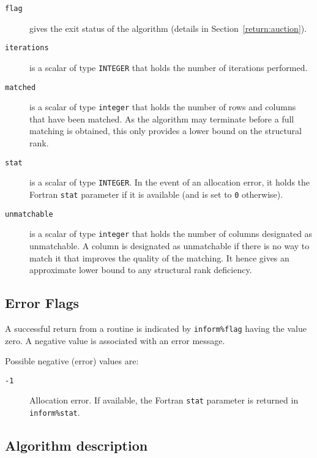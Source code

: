 \begin{description}

\item[\texttt{flag}] gives the exit status of the algorithm (details in Section~\ref{return:auction}).

\item[\texttt{iterations}] is a scalar of type \texttt{INTEGER} that holds the number of iterations performed.

\item[\texttt{matched}] is a scalar of type \texttt{integer} that holds the number of rows and columns that have been matched. As the algorithm may terminate before a full matching is obtained, this only provides a lower bound on the structural rank.

\item[\texttt{stat}] is a scalar of type \texttt{INTEGER}. In the event of an allocation error, it holds the Fortran \texttt{stat} parameter if it is available (and is set to \texttt{0} otherwise).

\item[\texttt{unmatchable}] is a scalar of type \texttt{integer} that holds the number of columns designated as unmatchable. A column is designated as unmatchable if there is no way to match it that improves the quality of the matching. It hence gives an approximate lower bound to any structural rank deficiency.

\end{description}

\subsection{Error Flags} \label{returns:auction}
A successful return from a routine is indicated by \texttt{inform\%flag} having the value zero. A negative value is associated with an error message.

Possible negative (error) values are:
\begin{description}
\item[\texttt{-1}] Allocation error. If available, the Fortran \texttt{stat} parameter is returned in \texttt{inform\%stat}.
\end{description}

\subsection{Algorithm description}

